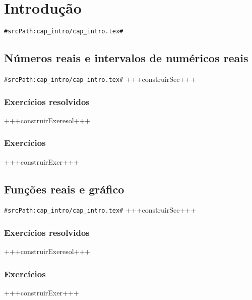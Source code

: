 
\chapter{Introdução}
\verb+#srcPath:cap_intro/cap_intro.tex#+
\label{chap:introducao}


\section{Números reais e intervalos de numéricos reais}
\verb+#srcPath:cap_intro/cap_intro.tex#+
\label{sec:intro_reais}
+++construirSec+++

\subsection*{Exercícios resolvidos}

+++construirExeresol+++


\subsection*{Exercícios}

+++construirExer+++


\section{Funções reais e gráfico}
\verb+#srcPath:cap_intro/cap_intro.tex#+
\label{sec:intro_fun_reais}
+++construirSec+++

\subsection*{Exercícios resolvidos}

+++construirExeresol+++


\subsection*{Exercícios}

+++construirExer+++


